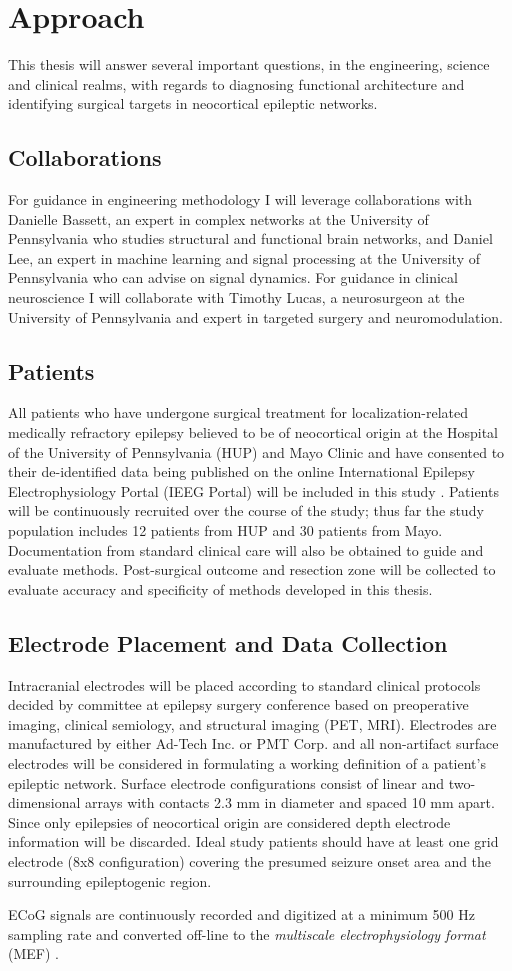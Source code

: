 \section{Approach}
This thesis will answer several important questions, in the engineering, science and clinical realms, with regards to diagnosing functional architecture and identifying surgical targets in neocortical epileptic networks.

\subsection{Collaborations}
\label{subsec:collaborations}
For guidance in engineering methodology I will leverage collaborations with Danielle Bassett, an expert in complex networks at the University of Pennsylvania who studies structural and functional brain networks, and Daniel Lee, an expert in machine learning and signal processing at the University of Pennsylvania who can advise on signal dynamics. For guidance in clinical neuroscience I will collaborate with Timothy Lucas, a neurosurgeon at the University of Pennsylvania and expert in targeted surgery and neuromodulation.

\subsection{Patients}
\label{subsec:patients}
All patients who have undergone surgical treatment for localization-related medically refractory epilepsy believed to be of neocortical origin at the Hospital of the University of Pennsylvania (HUP) and Mayo Clinic and have consented to their de-identified data being published on the online International Epilepsy Electrophysiology Portal (IEEG Portal) will be included in this study \cite{wagenaar2013multimodal}. Patients will be continuously recruited over the course of the study; thus far the study population includes 12 patients from HUP and 30 patients from Mayo. Documentation from standard clinical care will also be obtained to guide and evaluate methods. Post-surgical outcome and resection zone will be collected to evaluate accuracy and specificity of methods developed in this thesis.

\subsection{Electrode Placement and Data Collection}
\label{subsec:elecdata}
Intracranial electrodes will be placed according to standard clinical protocols decided by committee at epilepsy surgery conference based on preoperative imaging, clinical semiology, and structural imaging (PET, MRI). Electrodes are manufactured by either Ad-Tech Inc. or PMT Corp. and all non-artifact surface electrodes will be considered in formulating a working definition of a patient's epileptic network. Surface electrode configurations consist of linear and two-dimensional arrays with contacts 2.3 mm in diameter and spaced 10 mm apart. Since only epilepsies of neocortical origin are considered depth electrode information will be discarded. Ideal study patients should have at least one grid electrode (8x8 configuration) covering the presumed seizure onset area and the surrounding epileptogenic region.

ECoG signals are continuously recorded and digitized at a minimum 500 Hz sampling rate and converted off-line to the \textit{multiscale electrophysiology format} (MEF) \cite{brinkmann2009large-scale}.
